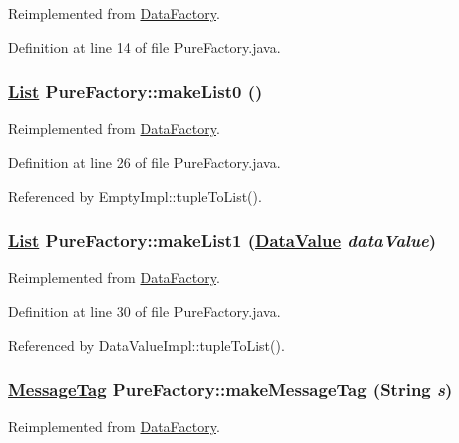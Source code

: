 Reimplemented from \hyperlink{interfaceDataFactory_a2}{Data\-Factory}.

Definition at line 14 of file Pure\-Factory.java.\hypertarget{classPureFactory_a5}{
\subsubsection[makeList0]{\setlength{\rightskip}{0pt plus 5cm}\hyperlink{interfaceList}{List} Pure\-Factory::make\-List0 ()}}
\label{classPureFactory_a5}




Reimplemented from \hyperlink{interfaceDataFactory_a7}{Data\-Factory}.

Definition at line 26 of file Pure\-Factory.java.

Referenced by Empty\-Impl::tuple\-To\-List().

\hypertarget{classPureFactory_a6}{
\subsubsection[makeList1]{\setlength{\rightskip}{0pt plus 5cm}\hyperlink{interfaceList}{List} Pure\-Factory::make\-List1 (\hyperlink{interfaceDataValue}{Data\-Value} {\em data\-Value})}}
\label{classPureFactory_a6}




Reimplemented from \hyperlink{interfaceDataFactory_a6}{Data\-Factory}.

Definition at line 30 of file Pure\-Factory.java.

Referenced by Data\-Value\-Impl::tuple\-To\-List().

\hypertarget{classPureFactory_a4}{
\subsubsection[makeMessageTag]{\setlength{\rightskip}{0pt plus 5cm}\hyperlink{interfaceMessageTag}{Message\-Tag} Pure\-Factory::make\-Message\-Tag (String {\em s})}}
\label{classPureFactory_a4}




Reimplemented from \hyperlink{interfaceDataFactory_a5}{Data\-Factory}.

